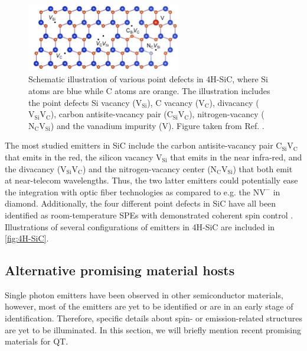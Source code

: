 \begin{figure}
  \centering
  \includegraphics[width=0.6\textwidth]{theory/figures/4H-SiC.png}
  \caption{Schematic illustration of various point defects in 4H-SiC, where Si atoms are blue while C atoms are orange. The illustration includes the point defects Si vacancy ($\text{V}_{\text{Si}}$), C vacancy ($\text{V}_{\text{C}}$), divacancy ($\text{V}_{\text{Si}}\text{V}_{\text{C}}$), carbon antisite-vacancy pair ($\text{C}_{\text{Si}}\text{V}_{\text{C}}$), nitrogen-vacancy ($\text{N}_{\text{C}}\text{V}_{\text{Si}}$) and the vanadium impurity ($\text{V}$). Figure taken from Ref. \cite{Bathen2020}.}
  \label{fig:4H-SiC}
\end{figure}

The most studied emitters in SiC include the carbon antisite-vacancy pair $\text{C}_{\text{Si}}\text{V}_{\text{C}}$ that emits in the red, the silicon vacancy $\text{V}_{\text{Si}}$ that emits in the near infra-red, and the divacancy ($\text{V}_{\text{Si}}\text{V}_{\text{C}}$) and the nitrogen-vacancy center ($\text{N}_{\text{C}}\text{V}_{\text{Si}}$) that both emit at near-telecom wavelengths. Thus, the two latter emitters could potentially ease the integration with optic fiber technologies as compared to e.g. the $\text{NV}^{-}$ in diamond. Additionally, the four different point defects in SiC have all been identified as room-temperature SPEs with demonstrated coherent spin control \cite{Widmann2014, Kraus2013, Castelletto2013, Koehl2011, Bathen2019}. Illustrations of several configurations of emitters in 4H-SiC are included in \autoref{fig:4H-SiC}.

\subsection{Alternative promising material hosts}
\label{promising-material-hosts}

Single photon emitters have been observed in other semiconductor materials, however, most of the emitters are yet to be identified or are in an early stage of identification. Therefore, specific details about spin- or emission-related structures are yet to be illuminated. In this section, we will briefly mention recent promising materials for QT.

